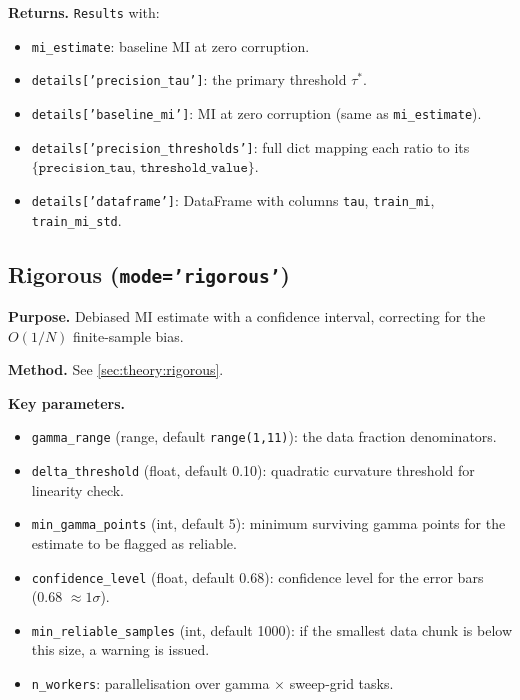 \documentclass[12pt]{article}
\newcommand{\api}[1]{\texttt{#1}}
\begin{document}
\textbf{Returns.}  \api{Results} with:
\begin{itemize}[leftmargin=*]
  \item \api{mi\_estimate}: baseline MI at zero corruption.
  \item \api{details['precision\_tau']}: the primary threshold $\tau^*$.
  \item \api{details['baseline\_mi']}: MI at zero corruption (same as
        \api{mi\_estimate}).
  \item \api{details['precision\_thresholds']}: full dict mapping each
        ratio to its $\{\api{precision\_tau},\,\api{threshold\_value}\}$.
  \item \api{details['dataframe']}: DataFrame with columns \api{tau},
        \api{train\_mi}, \api{train\_mi\_std}.
\end{itemize}

\subsection{Rigorous (\texttt{mode='rigorous'})}
\label{sec:modes:rigorous}

\textbf{Purpose.}  Debiased MI estimate with a confidence interval,
correcting for the $O(1/N)$ finite-sample bias.

\textbf{Method.}  See \cref{sec:theory:rigorous}.

\textbf{Key parameters.}
\begin{itemize}[leftmargin=*]
  \item \api{gamma\_range} (range, default \api{range(1,11)}): the data
        fraction denominators.
  \item \api{delta\_threshold} (float, default 0.10): quadratic curvature
        threshold for linearity check.
  \item \api{min\_gamma\_points} (int, default 5): minimum surviving
        gamma points for the estimate to be flagged as reliable.
  \item \api{confidence\_level} (float, default 0.68): confidence level
        for the error bars (0.68 $\approx 1\sigma$).
  \item \api{min\_reliable\_samples} (int, default 1000): if the smallest
        data chunk is below this size, a warning is issued.
  \item \api{n\_workers}: parallelisation over gamma $\times$ sweep-grid tasks.
\end{itemize}
\end{document}

